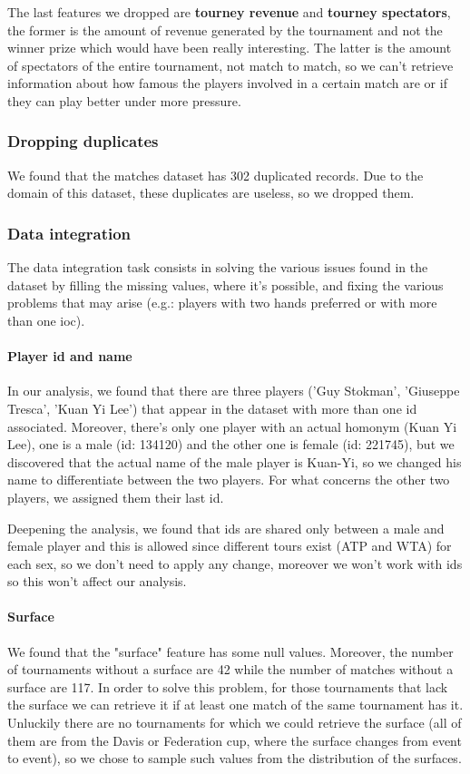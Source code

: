 The last features we dropped are \textbf{tourney revenue} and \textbf{tourney spectators}, the former is the amount of revenue generated by the tournament and not the winner prize which would have been really interesting. The latter is the amount of spectators of the entire tournament, not match to match, so we can't retrieve information about how famous the players involved in a certain match are or if they can play better under more pressure.

\subsubsection{Dropping duplicates}
We found that the matches dataset has 302 duplicated records. Due to the domain of this dataset, these duplicates are useless, so we dropped them.

\subsubsection{Data integration}
The data integration task consists in solving the various issues found in the dataset by filling the missing values, where it's possible, and fixing the various problems that may arise (e.g.: players with two hands preferred or with more than one ioc).
\paragraph{Player id and name}
In our analysis, we found that there are three players ('Guy Stokman', 'Giuseppe Tresca', 'Kuan Yi Lee') that appear in the dataset with more than one id associated. Moreover, there's only one player with an actual homonym (Kuan Yi Lee), one is a male (id: 134120) and the other one is female (id: 221745), but we discovered that the actual name of the male player is Kuan-Yi, so we changed his name to differentiate between the two players. For what concerns the other two players, we assigned them their last id.

Deepening the analysis, we found that ids are shared only between a male and female player and this is allowed since different tours exist (ATP and WTA) for each sex, so we don't need to apply any change, moreover we won't work with ids so this won't affect our analysis.

\paragraph{Surface}
We found that the "surface" feature has some null values. Moreover, the number of tournaments without a surface are 42 while the number of matches without a surface are 117. In order to solve this problem, for those tournaments that lack the surface  we can retrieve it if at least one match of the same tournament has it. Unluckily there are no tournaments for which we could retrieve the surface (all of them are from the Davis or Federation cup, where the surface changes from event to event), so we chose to sample such values from the distribution of the surfaces.

